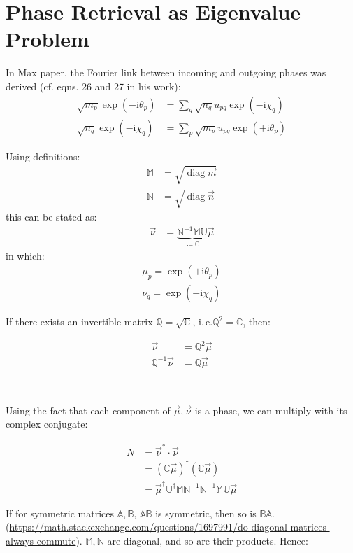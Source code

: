 \documentclass[
	english,
	a4paper,
	fontsize=10pt,
	parskip=half,
	titlepage=true,
	DIV=12,
	final
]{scrreprt}
\title{\myTitle}
\author{\myName}
\date{\today}
\newcommand*{\ie}{i.\,e.\xspace}
\newcommand*{\iunit}{\ensuremath{\mathrm{i}}}
\DeclareMathOperator{\diag}{diag}
\begin{document}
\tableofcontents
\newpage

\chapter{Phase Retrieval as Eigenvalue Problem}
In Max paper, the Fourier link between incoming and outgoing phases was derived (cf. eqns. 26 and 27 in his work):
\begin{align}
	\sqrt{m_p} \exp(-\iunit \theta_p) &= \sum_q \sqrt{n_q} u_{pq} \exp(-\iunit \chi  _q) \\
	\sqrt{n_q} \exp(-\iunit \chi  _q) &= \sum_p \sqrt{m_p} u_{pq} \exp(+\iunit \theta_p)
\end{align}

Using definitions:
\begin{align}
	\mathbb{M} &= \sqrt{\diag \vec{m}} \\
	\mathbb{N} &= \sqrt{\diag \vec{n}}
\end{align}
this can be stated as:
\begin{align}
	\vec{\nu}
&=
	\underbrace{
		\mathbb{N}^{-1} \mathbb{M} \mathbb{U}
	}_{\coloneqq \mathbb{C}}
	\vec{\mu}
\end{align}
in which:
\begin{align}
	\mu_p = \exp(+\iunit \theta_p) \\
	\nu_q = \exp(-\iunit \chi  _q)
\end{align}

If there exists an invertible matrix $\mathbb{Q} = \sqrt{\mathbb{C}}$, \ie $\mathbb{Q}^2 = \mathbb{C}$, then:

\begin{align}
	\vec{\nu}
&=
	\mathbb{Q}^2 \vec{\mu}
\\
	\mathbb{Q}^{-1} \vec{\nu}
&=
	\mathbb{Q} \vec{\mu}
\end{align}

---


Using the fact that each component of $\vec{\mu}, \vec{\nu}$ is a phase, we can multiply with its complex conjugate:

\begin{align}
	N
&=
	\vec{\nu}^* \cdot \vec{\nu} \\
&=
	(\mathbb{C} \vec{\mu})^\dagger (\mathbb{C} \vec{\mu}) \\
&=
	\vec{\mu}^\dagger \mathbb{U}^\dagger \mathbb{M} \mathbb{N}^{-1}
	\mathbb{N}^{-1} \mathbb{M} \mathbb{U} \vec{\mu}	
\end{align}

If for symmetric matrices $\mathbb{A}, \mathbb{B}$, $\mathbb{AB}$ is symmetric, then so is $\mathbb{BA}$. (\url{https://math.stackexchange.com/questions/1697991/do-diagonal-matrices-always-commute}). $\mathbb{M}, \mathbb{N}$ are diagonal, and so are their products. Hence:
\end{document}
